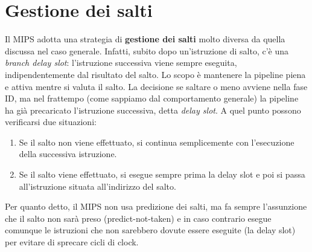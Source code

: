 \section{Gestione dei salti}
Il MIPS adotta una strategia di \textbf{gestione dei salti} molto diversa da quella discussa nel caso generale. Infatti, subito dopo un'istruzione di salto, c'è una \textit{branch delay slot}: l'istruzione successiva viene sempre eseguita, indipendentemente dal risultato del salto. Lo scopo è mantenere la pipeline piena e attiva mentre si valuta il salto. La decisione se saltare o meno avviene nella fase ID, ma nel frattempo (come sappiamo dal comportamento generale) la pipeline ha già precaricato l'istruzione successiva, detta \textit{delay slot}. A quel punto possono verificarsi due situazioni:
\begin{enumerate}
	\item Se il salto non viene effettuato, si continua semplicemente con l'esecuzione della successiva istruzione.
	\item Se il salto viene effettuato, si esegue sempre prima la delay slot e poi si passa all'istruzione situata all'indirizzo del salto.
\end{enumerate}
Per quanto detto, il MIPS non usa predizione dei salti, ma fa sempre l'assunzione che il salto non sarà preso (predict-not-taken) e in caso contrario esegue comunque le istruzioni che non sarebbero dovute essere eseguite (la delay slot) per evitare di sprecare cicli di clock.




